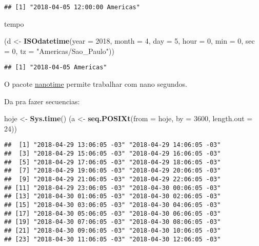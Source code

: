 \documentclass[]{book}
\newenvironment{Shaded}{\begin{snugshade}}{\end{snugshade}}
\newcommand{\KeywordTok}[1]{\textcolor[rgb]{0.13,0.29,0.53}{\textbf{#1}}}
\newcommand{\DataTypeTok}[1]{\textcolor[rgb]{0.13,0.29,0.53}{#1}}
\newcommand{\DecValTok}[1]{\textcolor[rgb]{0.00,0.00,0.81}{#1}}
\newcommand{\StringTok}[1]{\textcolor[rgb]{0.31,0.60,0.02}{#1}}
\newcommand{\NormalTok}[1]{#1}
\theoremstyle{definition}
\theoremstyle{definition}
\theoremstyle{definition}
\theoremstyle{remark}
\begin{document}
\begin{verbatim}
## [1] "2018-04-05 12:00:00 Americas"
\end{verbatim}

tempo

\begin{Shaded}
\begin{Highlighting}[]
\NormalTok{(d <-}\StringTok{ }\KeywordTok{ISOdatetime}\NormalTok{(}\DataTypeTok{year =} \DecValTok{2018}\NormalTok{, }\DataTypeTok{month =} \DecValTok{4}\NormalTok{, }\DataTypeTok{day =} \DecValTok{5}\NormalTok{, }\DataTypeTok{hour =} \DecValTok{0}\NormalTok{, }\DataTypeTok{min =} \DecValTok{0}\NormalTok{, }\DataTypeTok{sec =} \DecValTok{0}\NormalTok{,}
                  \DataTypeTok{tz =} \StringTok{"Americas/Sao_Paulo"}\NormalTok{))}
\end{Highlighting}
\end{Shaded}

\begin{verbatim}
## [1] "2018-04-05 Americas"
\end{verbatim}

O pacote \href{https://github.com/eddelbuettel/nanotime}{nanotime}
permite trabalhar com nano segundos.

Da pra fazer secuencias:

\begin{Shaded}
\begin{Highlighting}[]
\NormalTok{hoje <-}\StringTok{ }\KeywordTok{Sys.time}\NormalTok{()}
\NormalTok{(a <-}\StringTok{ }\KeywordTok{seq.POSIXt}\NormalTok{(}\DataTypeTok{from =}\NormalTok{ hoje, }\DataTypeTok{by =} \DecValTok{3600}\NormalTok{, }\DataTypeTok{length.out =} \DecValTok{24}\NormalTok{))}
\end{Highlighting}
\end{Shaded}

\begin{verbatim}
##  [1] "2018-04-29 13:06:05 -03" "2018-04-29 14:06:05 -03"
##  [3] "2018-04-29 15:06:05 -03" "2018-04-29 16:06:05 -03"
##  [5] "2018-04-29 17:06:05 -03" "2018-04-29 18:06:05 -03"
##  [7] "2018-04-29 19:06:05 -03" "2018-04-29 20:06:05 -03"
##  [9] "2018-04-29 21:06:05 -03" "2018-04-29 22:06:05 -03"
## [11] "2018-04-29 23:06:05 -03" "2018-04-30 00:06:05 -03"
## [13] "2018-04-30 01:06:05 -03" "2018-04-30 02:06:05 -03"
## [15] "2018-04-30 03:06:05 -03" "2018-04-30 04:06:05 -03"
## [17] "2018-04-30 05:06:05 -03" "2018-04-30 06:06:05 -03"
## [19] "2018-04-30 07:06:05 -03" "2018-04-30 08:06:05 -03"
## [21] "2018-04-30 09:06:05 -03" "2018-04-30 10:06:05 -03"
## [23] "2018-04-30 11:06:05 -03" "2018-04-30 12:06:05 -03"
\end{verbatim}
\end{document}
